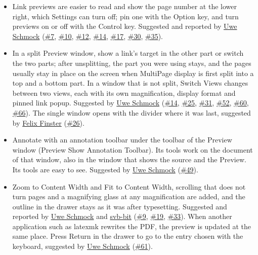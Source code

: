 \documentclass[11pt,letterpaper]{article}
\begin{document}
\begin{itemize}
\item Link previews are easier to read and show the page number at the lower right, which Settings can turn off; pin one with the Option key, and turn previews on or off with the Control key. Suggested and reported by \href{https://github.com/Uwe-Schmock}{Uwe Schmock} (\href{https://github.com/TeXShopProject/TeXShop/issues/7}{\#7}, \href{https://github.com/TeXShopProject/TeXShop/issues/10}{\#10}, \href{https://github.com/TeXShopProject/TeXShop/issues/12}{\#12}, \href{https://github.com/TeXShopProject/TeXShop/issues/14}{\#14}, \href{https://github.com/TeXShopProject/TeXShop/issues/17}{\#17}, \href{https://github.com/TeXShopProject/TeXShop/issues/30}{\#30}, \href{https://github.com/TeXShopProject/TeXShop/issues/35}{\#35}).
\item In a split Preview window, show a link’s target in the other part or switch the two parts; after unsplitting, the part you were using stays, and the pages usually stay in place on the screen when MultiPage display is first split into a top and a bottom part. In a window that is not split, Switch Views changes between two views, each with its own magnification, display format and pinned link popup. Suggested by \href{https://github.com/Uwe-Schmock}{Uwe Schmock} (\href{https://github.com/TeXShopProject/TeXShop/issues/14}{\#14}, \href{https://github.com/TeXShopProject/TeXShop/issues/25}{\#25}, \href{https://github.com/TeXShopProject/TeXShop/issues/31}{\#31}, \href{https://github.com/TeXShopProject/TeXShop/issues/52}{\#52}, \href{https://github.com/TeXShopProject/TeXShop/issues/60}{\#60}, \href{https://github.com/TeXShopProject/TeXShop/issues/66}{\#66}). The single window opens with the divider where it was last, suggested by \href{https://github.com/felix-finster}{Felix Finster} (\href{https://github.com/TeXShopProject/TeXShop/issues/26}{\#26}).
\item Annotate with an annotation toolbar under the toolbar of the Preview window (Preview \guilsinglright{} Show Annotation Toolbar). Its tools work on the document of that window, also in the window that shows the source and the Preview. Its tools are easy to see. Suggested by \href{https://github.com/Uwe-Schmock}{Uwe Schmock} (\href{https://github.com/TeXShopProject/TeXShop/issues/49}{\#49}).
\item Zoom to Content Width and Fit to Content Width, scrolling that does not turn pages and a magnifying glass at any magnification are added, and the outline in the drawer stays as it was after typesetting. Suggested and reported by \href{https://github.com/Uwe-Schmock}{Uwe Schmock} and \href{https://github.com/svb-bit}{svb-bit} (\href{https://github.com/TeXShopProject/TeXShop/issues/9}{\#9}, \href{https://github.com/TeXShopProject/TeXShop/issues/19}{\#19}, \href{https://github.com/TeXShopProject/TeXShop/issues/33}{\#33}). When another application such as latexmk rewrites the PDF, the preview is updated at the same place. Press Return in the drawer to go to the entry chosen with the keyboard, suggested by \href{https://github.com/Uwe-Schmock}{Uwe Schmock} (\href{https://github.com/TeXShopProject/TeXShop/issues/61}{\#61}).

\end{itemize}
\end{document}
